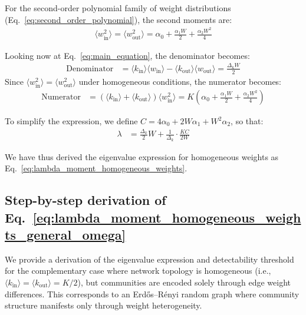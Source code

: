 \documentclass[a4paper,pre,superscriptaddress,floatfix,nofootinbib,twocolumn]{revtex4-1}
\begin{document}
For the second-order polynomial family of weight distributions (Eq.~\eqref{eq:second_order_polynomial}), the second moments are:
\begin{align*}
\langle w^2_\text{in} \rangle = \langle w^2_\text{out} \rangle = \alpha_0 + \frac{\alpha_1 W}{2} + \frac{\alpha_2 W^2}{4}
\end{align*}

Looking now at Eq.~\eqref{eq:main_equation}, the denominator becomes:
\begin{align*}
\text{Denominator} &= \langle k_{\text{in}} \rangle \langle w_\text{in} \rangle - \langle k_{\text{out}} \rangle \langle w_\text{out} \rangle = \frac{\Delta_k W}{2}
\end{align*}
Since $\langle w^2_\text{in} \rangle = \langle w^2_\text{out} \rangle$ under homogeneous conditions, the numerator becomes:
\begin{align*}
\text{Numerator} &= (\langle k_{\text{in}} \rangle + \langle k_{\text{out}} \rangle) \langle w^2_\text{in} \rangle = K \left(\alpha_0 + \frac{\alpha_1 W}{2} + \frac{\alpha_2 W^2}{4}\right)
\end{align*}


To simplify the expression, we define $C = 4\alpha_0 + 2W\alpha_1 + W^2\alpha_2$, so that:
\begin{align*}
\lambda &= \frac{\Delta_k}{2}W + \frac{1}{\Delta_k} \cdot \frac{KC}{2W}
\end{align*}

We have thus derived the eigenvalue expression for homogeneous weights as Eq.~\eqref{eq:lambda_moment_homogeneous_weights}.


\subsection*{Step-by-step derivation of Eq.~\eqref{eq:lambda_moment_homogeneous_weights_general_omega}}
\label{sec:detailed_derivation_homogeneous_topology}

We provide a derivation of the eigenvalue expression and detectability threshold for the complementary case where network topology is homogeneous (i.e., $\langle k_{\text{in}} \rangle = \langle k_{\text{out}} \rangle = K/2$), but communities are encoded solely through edge weight differences. This corresponds to an Erd\H{o}s--R\'enyi random graph where community structure manifests only through weight heterogeneity.
\end{document}
